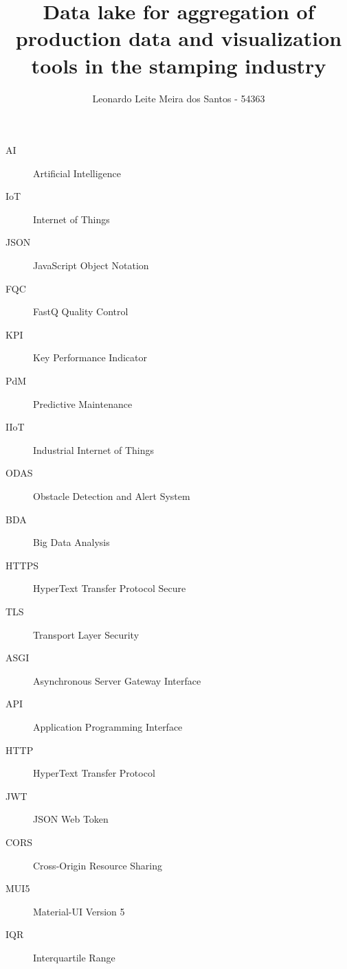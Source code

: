 \documentclass[12pt,a4paper,twoside]{ipb}
\title{Data lake for aggregation of production data and visualization tools in the stamping industry}
\author{Leonardo Leite Meira dos Santos - 54363}
\makeatletter
\renewcommand{\cleardoublepage}{\clearpage\if@twoside \ifodd\c@page\else
\hbox{}\newpage\if@twocolumn\hbox{}\newpage\fi\fi\fi}
\renewcommand{\cleardoublepage}{\clearpage}
\makeatother
\begin{document}
	

\beforepreface


%


%







\afterpreface
\printglossary[type=\acronymtype,title={Acrónimos}]
\printglossary[type=\acronymtype,title={Siglas}]

\begin{description}
    \item[AI] Artificial Intelligence
    \item[IoT] Internet of Things
    \item[JSON] JavaScript Object Notation
    \item[FQC] FastQ Quality Control
    \item[KPI] Key Performance Indicator
    \item[PdM] Predictive Maintenance
    \item[IIoT] Industrial Internet of Things
    \item[ODAS] Obstacle Detection and Alert System
    \item[BDA] Big Data Analysis
    \item[HTTPS] HyperText Transfer Protocol Secure
    \item[TLS] Transport Layer Security
    \item[ASGI] Asynchronous Server Gateway Interface
    \item[API] Application Programming Interface
    \item[HTTP] HyperText Transfer Protocol
    \item[JWT] JSON Web Token
    \item[CORS] Cross-Origin Resource Sharing
    \item[MUI5] Material-UI Version 5
    \item[IQR] Interquartile Range
\end{description}
\end{document}
